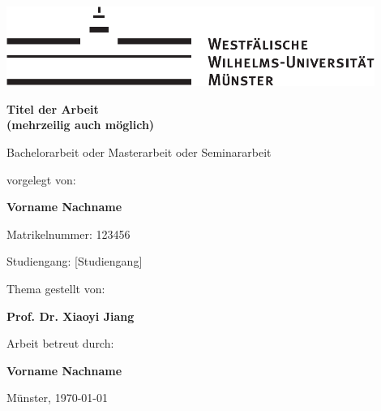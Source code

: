 \begin{centering}
\vspace*{\fill}
\includegraphics[width=12cm]{./img/wwu-logo-neu.pdf}

\vspace{3cm} 

{\LARGE
	\textbf{Titel der Arbeit\\
			(mehrzeilig auch möglich)}\\[1.2cm]
}

{\large
	Bachelorarbeit oder Masterarbeit oder Seminararbeit\\[2cm]
}

{\large
	vorgelegt von:
}

{ \Large
	\textbf{Vorname Nachname}\\[1cm]
}

{\large
	Matrikelnummer: 123456\\[2mm]
}

{\large
	Studiengang: [Studiengang]\\[1cm]
}
    
{\large
	Thema gestellt von:
}

{\Large
	\textbf{Prof. Dr. Xiaoyi Jiang}\\[1cm]
}
                               
{\large
	Arbeit betreut durch:
}

{\Large
	\textbf{Vorname Nachname}\\[1cm]
}

{\large
Münster, \today
}
\vfill
\end{centering}